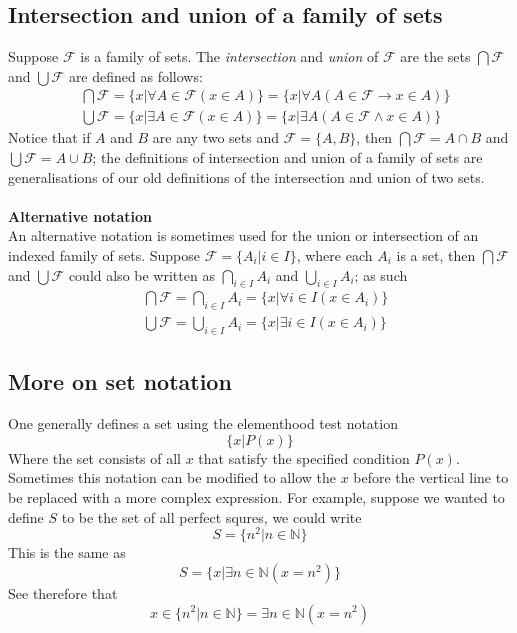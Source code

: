 \documentclass{report}
\theoremstyle{definition}
\begin{document}
\subsection{Intersection and union of a family of sets}
Suppose $\mathcal{F}$ is a family of sets. The \textit{intersection} and \textit{union} of $\mathcal{F}$ are the sets $\bigcap\mathcal{F}$ and $\bigcup\mathcal{F}$ are defined as follows:
\begin{align*}
&\bigcap\mathcal F=\{x|\forall A\in\mathcal F(x\in A)\}=\{x|\forall A(A\in\mathcal F\to x\in A)\}\\
&\bigcup\mathcal F=\{x|\exists A\in\mathcal F(x\in A)\}=\{x|\exists A(A\in\mathcal F\land x\in A)\}
\end{align*}
Notice that if $A$ and $B$ are any two sets and $\mathcal F=\{A,B\}$, then $\bigcap\mathcal F=A\cap B$ and $\bigcup\mathcal F=A\cup B$; the definitions of intersection and union of a family of sets
are generalisations of our old definitions of the intersection and union of two sets.\\
\vspace{1mm}\\
\textbf{Alternative notation}\\
An alternative notation is sometimes used for the union or intersection of an indexed family of sets. Suppose $\mathcal F=\{A_i|i\in I\}$, where each $A_i$ is a set,
then $\bigcap\mathcal F$ and $\bigcup\mathcal F$ could also be written as 
$\bigcap_{i\in I}A_i$ and $\bigcup_{i\in I}A_i$; as such
\begin{align*}
&\bigcap\mathcal F=\bigcap_{i\in I}A_i=\{x|\forall i\in I(x\in A_i)\}\\
&\bigcup\mathcal F=\bigcup_{i\in I}A_i=\{x|\exists i\in I(x\in A_i)\}
\end{align*}
\newpage

\subsection{More on set notation}
One generally defines a set using the elementhood test notation
\begin{equation*}
\{x|P(x)\}
\end{equation*}
Where the set consists of all $x$ that satisfy the specified condition $P(x)$. Sometimes this notation can be modified to allow the $x$ before the vertical line to be replaced
with a more complex expression. For example, suppose we wanted to define $S$ to be the set of all
perfect squres, we could write
\begin{equation*}
S=\{n^2|n\in\mathbb{N}\}
\end{equation*}
This is the same as
\begin{equation*}
S=\{x|\exists n\in\mathbb N(x=n^2)\}
\end{equation*}
See therefore that 
\begin{equation*}
x\in\{n^2|n\in\mathbb{N}\}=\exists n\in\mathbb N(x=n^2)
\end{equation*}
\end{document}
